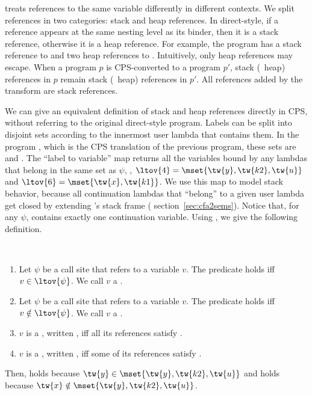\documentclass{LMCS}
\theoremstyle{definition} \newtheorem{property}[thm]{Property}
\begin{document}
\cfat{} treats references to the same variable differently in different 
contexts.
We split references in two categories: stack and heap references.
In direct-style, if a reference appears at the same nesting level as its binder,
then it is a stack reference, otherwise it is a heap reference.
For example, the program  has a stack 
reference to  and two heap references to .
Intuitively, only heap references may escape.
When a program $p$ is CPS-converted to a program $p'$, stack (\resp\ heap) 
references in $p$ remain stack (\resp\ heap) references in $p'$.
All references added by the transform are stack references.

We can give an equivalent definition of stack and heap references directly in
CPS, without referring to the original direct-style program.
Labels can be split into disjoint sets according to the innermost user lambda 
that contains them.
In the program , 
which is the CPS translation of the previous program, these sets are 
and .
The ``label to variable'' map \ltov{\psi} returns all the variables bound by 
any lambdas that belong in the same set as $\psi$, \eg, $\ltov{4} = 
\mset{\tw{y}, \tw{k2}, \tw{u}}$ and $\ltov{6} = \mset{\tw{x}, \tw{k1}}$.
We use this map to model stack behavior, because all continuation lambdas that 
``belong'' to a given user lambda  get closed by extending 
's stack frame (\confer{} section~\ref{sec:cfa2sems}).
Notice that, for any $\psi$, \ltov{\psi} contains exactly one continuation 
variable.
Using \ltovNA, we give the following definition.
\vfill\eject

\begin{defi} 
  ~ \begin{enumerate}[$\bullet$]
  \item
    Let $\psi$ be a call site that refers to a variable $v$.
    The predicate  holds iff $v \in \ltov{\psi}$.
    We call $v$ a .
  \item
    Let $\psi$ be a call site that refers to a variable $v$.
    The predicate  holds iff $v \notin \ltov{\psi}$.
    We call $v$ a .
  \item
    $v$ is a , written , iff all its references 
    satisfy \instackNA.
  \item
    $v$ is a , written , iff some of its references
    satisfy \inheapNA.
  \end{enumerate}
\end{defi}
\noindent
Then,  holds because $\tw{y} \in 
\mset{\tw{y}, \tw{k2}, \tw{u}}$ and  holds because
$\tw{x} \notin \mset{\tw{y}, \tw{k2}, \tw{u}}$.
\end{document}
